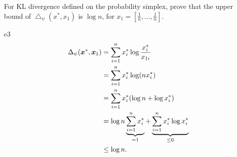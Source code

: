\begin{excercise}\label{e3}
    For KL divergence defined on the probability simplex,  prove that the upper bound of 
    $\bigtriangleup_{\psi} (x^*, x_{1}) $ is $\log n$, for $x_1 = [\frac{1}{n}, \ldots, \frac{1}{n}]$.
\end{excercise}
    
\begin{PROOF}{e3}
    \[
        \begin{aligned}
            \Delta_\psi(\bm{x}^*, \bm{x}_1) &= \sum_{i=1}^n x^*_i \log \frac{x^*_i}{x_{1i}} \\
            &= \sum_{i=1}^n x^*_i \log (n x^*_i) \\
            &= \sum_{i=1}^n x^*_i (\log n + \log x^*_i) \\
            &= \log n \underbrace{\sum_{i=1}^n x^*_i}_{=1} + \underbrace{\sum_{i=1}^n x^*_i \log x^*_i}_{ \le 0} \\
            &\le \log n.
        \end{aligned}  
    \]
\end{PROOF}